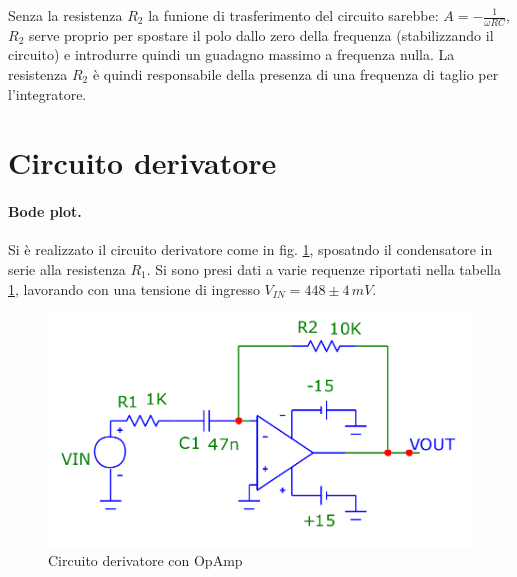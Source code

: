 \documentclass[10pt,a4paper]{article}
\begin{document}
Senza la resistenza $R_2$ la funione di trasferimento del circuito sarebbe: $A = -\frac{1}{\omega RC}$, $R_2$ serve proprio per spostare il polo dallo zero della frequenza (stabilizzando il circuito) e introdurre quindi un guadagno massimo a frequenza nulla. La resistenza $R_2$ è quindi responsabile della presenza di una frequenza di taglio per l'integratore.

\section{Circuito derivatore}
\paragraph{Bode plot.} Si è realizzato il circuito derivatore come in fig. \ref{derivatore}, sposatndo il condensatore in serie alla resistenza $R_1$. Si sono presi dati a varie requenze riportati nella tabella \ref{derivatore}, lavorando con una tensione di ingresso $V_{IN} = 448 \pm 4 \, mV$.\\

\begin{figure}[!htb]
\centering
  \includegraphics[scale=0.25]{derivatore.png}
\caption{Circuito derivatore con OpAmp}
\label{derivatore}
\end{figure}
\end{document}
